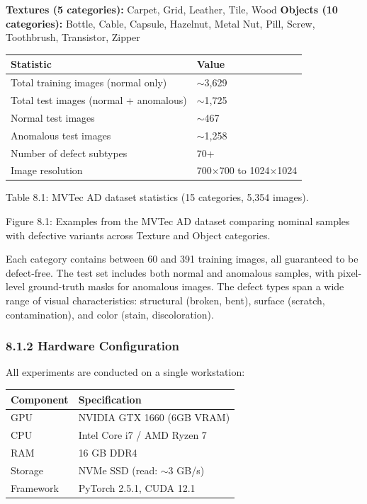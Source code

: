 \documentclass[12pt, a4paper, oneside]{report}
\begin{document}
\textbf{Textures (5 categories):} Carpet, Grid, Leather, Tile, Wood \textbf{Objects (10 categories):} Bottle, Cable, Capsule, Hazelnut, Metal Nut, Pill, Screw, Toothbrush, Transistor, Zipper

{\def\LTcaptype{none} %
\begin{longtable}[]{@{}ll@{}}
\toprule\noalign{}
Statistic & Value \\
\midrule\noalign{}
\endhead
\bottomrule\noalign{}
\endlastfoot
Total training images (normal only) & ${\sim}$3,629 \\
Total test images (normal + anomalous) & ${\sim}$1,725 \\
Normal test images & ${\sim}$467 \\
Anomalous test images & ${\sim}$1,258 \\
Number of defect subtypes & 70+ \\
Image resolution & 700$\times$700 to 1024$\times$1024 \\
\end{longtable}
}

Table 8.1: MVTec AD dataset statistics (15 categories, 5,354 images).

Figure 8.1: Examples from the MVTec AD dataset comparing nominal samples with defective variants across Texture and Object categories.

Each category contains between 60 and 391 training images, all guaranteed to be defect-free. The test set includes both normal and anomalous samples, with pixel-level ground-truth masks for anomalous images. The defect types span a wide range of visual characteristics: structural (broken, bent), surface (scratch, contamination), and color (stain, discoloration).

\subsubsection{8.1.2 Hardware Configuration}\label{hardware-configuration}

All experiments are conducted on a single workstation:

{\def\LTcaptype{none} %
\begin{longtable}[]{@{}ll@{}}
\toprule\noalign{}
Component & Specification \\
\midrule\noalign{}
\endhead
\bottomrule\noalign{}
\endlastfoot
GPU & NVIDIA GTX 1660 (6GB VRAM) \\
CPU & Intel Core i7 / AMD Ryzen 7 \\
RAM & 16 GB DDR4 \\
Storage & NVMe SSD (read: ${\sim}$3 GB/s) \\
Framework & PyTorch 2.5.1, CUDA 12.1 \\
\end{longtable}
}
\end{document}
